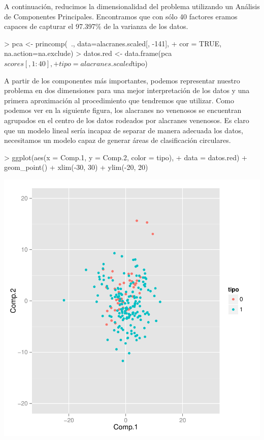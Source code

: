 \documentclass{article}
\begin{document}
\begin{Schunk}
\end{Schunk}

A continuación, reducimos la dimensionalidad del problema utilizando un Análisis de Componentes Principales. Encontramos que con sólo 40 factores eramos capaces de capturar el 97.397\% de la varianza de los datos.

\begin{Schunk}
\begin{Sinput}
> pca <- princomp(~., data=alacranes.scaled[, -141],
+                 cor = TRUE, na.action=na.exclude)
> datos.red <- data.frame(pca$scores[,1:40],
+                         tipo = alacranes.scaled$tipo)
\end{Sinput}
\end{Schunk}

A partir de los componentes más importantes, podemos representar nuestro problema en dos dimensiones para una mejor interpretación de los datos y una primera aproximación al procedimiento que tendremos que utilizar. Como podemos ver en la siguiente figura, los alacranes no venenosos se encuentran agrupados en el centro de los datos rodeados por alacranes venenosos. Es claro que un modelo lineal sería incapaz de separar de manera adecuada los datos, necesitamos un modelo capaz de generar áreas de clasificación circulares.
\begin{Schunk}
\begin{Sinput}
> ggplot(aes(x = Comp.1, y = Comp.2, color = tipo),
+        data = datos.red) + geom_point() + xlim(-30, 30) + ylim(-20, 20)
\end{Sinput}
\end{Schunk}
\includegraphics{Final-004}
\end{document}
